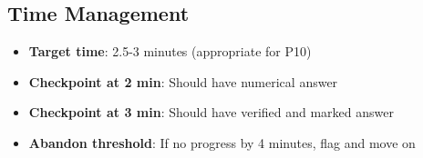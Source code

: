 \documentclass[]{article}
\begin{document}
\begin{solutionbox}
\subsection*{Time Management}
\begin{itemize}[leftmargin=*]
    \item \textbf{Target time}: 2.5-3 minutes (appropriate for P10)
    \item \textbf{Checkpoint at 2 min}: Should have numerical answer
    \item \textbf{Checkpoint at 3 min}: Should have verified and marked answer
    \item \textbf{Abandon threshold}: If no progress by 4 minutes, flag and move on
\end{itemize}
\end{solutionbox}
\end{document}
